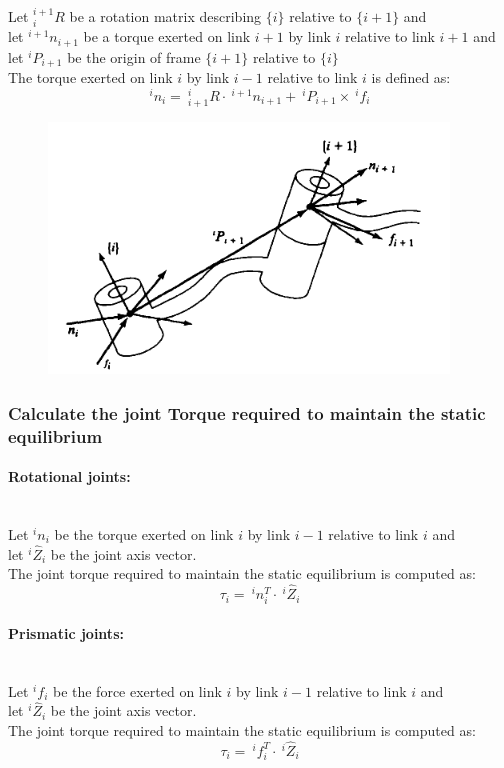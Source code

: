 \documentclass[10pt,a4paper]{article}
\begin{document}
Let $^{i+1}_iR$ be a rotation matrix describing $\{i\}$ relative to $\{i+1\}$ and\\
let $^{i+1}n_{i+1}$ be a torque exerted on link $i+1$ by link $i$ relative to link $i+1$ and \\
let $^iP_{i+1}$ be the origin of frame $\{i+1\}$ relative to $\{i\}$ \\
The torque exerted on link $i$ by link $i-1$ relative to link $i$ is defined as:
$$
^in_i = ~^i_{i+1}R ⋅ ~^{i+1}n_{i+1} + ~^iP_{i+1} \times ~^if_i
$$

\begin{figure}[H]
	\includegraphics[width=0.5\columnwidth]{imgs/link_forces.png}
\end{figure}

\subsubsection{Calculate the joint Torque required to maintain the static equilibrium}
\paragraph{Rotational joints:} ~\\
Let $^in_i$ be the torque exerted on link $i$ by link $i-1$ relative to link $i$ and\\
let $^i\hat{Z}_i$ be the joint axis vector. \\
The joint torque required to maintain the static equilibrium is computed as:
$$
	\tau_i = ~^in_i^T ⋅ ~^i\hat{Z}_i
$$

\paragraph{Prismatic joints:} ~\\
Let $^if_i$ be the force exerted on link $i$ by link $i-1$ relative to link $i$ and\\
let $^i\hat{Z}_i$ be the joint axis vector. \\
The joint torque required to maintain the static equilibrium is computed as:
$$
\tau_i = ~^if_i^T ⋅ ~^i\hat{Z}_i
$$
\end{document}
